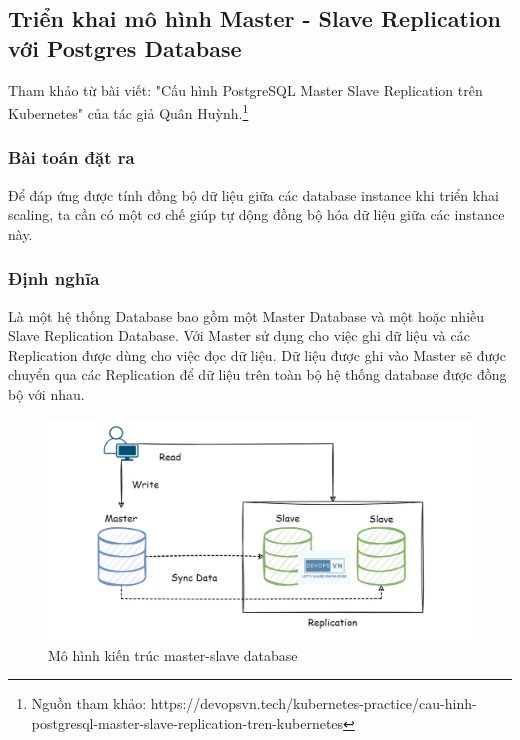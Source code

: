 \subsection{Triển khai mô hình Master - Slave Replication với Postgres Database}
\noindent Tham khảo từ bài viết: "Cấu hình PostgreSQL Master Slave Replication trên Kubernetes" của tác giả Quân Huỳnh.\footnote{Nguồn tham khảo: https://devopsvn.tech/kubernetes-practice/cau-hinh-postgresql-master-slave-replication-tren-kubernetes}
\subsubsection{Bài toán đặt ra}
\noindent Để đáp ứng được tính đồng bộ dữ liệu giữa các database instance khi triển khai scaling, ta cần có một cơ chế giúp tự dộng đồng bộ hóa dữ liệu giữa các instance này.
\subsubsection{Định nghĩa}
\noindent Là một hệ thống Database bao gồm một Master Database và một hoặc nhiều Slave Replication Database. Với Master sử dụng cho việc ghi dữ liệu và các Replication được dùng cho việc đọc dữ liệu. Dữ liệu được ghi vào Master sẽ được chuyển qua các Replication để dữ liệu trên toàn bộ hệ thống database được đồng bộ với nhau.
\begin{figure}[H]
  \begin{center}
    \includegraphics[scale=0.22]{images/phat/master-slave-archi.jpg}
    \caption{Mô hình kiến trúc master-slave database}
  \end{center}
\end{figure}
